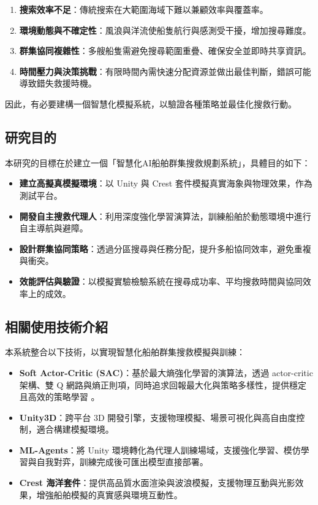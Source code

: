 \documentclass[12pt,a4paper]{article}
\begin{document}
\begin{enumerate}
\item \textbf{搜索效率不足}：傳統搜索在大範圍海域下難以兼顧效率與覆蓋率。
\item \textbf{環境動態與不確定性}：風浪與洋流使船隻航行與感測受干擾，增加搜尋難度\cite{IAMSAR2008}。
\item \textbf{群集協同複雜性}：多艘船隻需避免搜尋範圍重疊、確保安全並即時共享資訊\cite{IAMSAR2008}。
\item \textbf{時間壓力與決策挑戰}：有限時間內需快速分配資源並做出最佳判斷，錯誤可能導致錯失救援時機。
\end{enumerate}

因此，有必要建構一個智慧化模擬系統，以驗證各種策略並最佳化搜救行動。

\subsection{研究目的}
本研究的目標在於建立一個「智慧化AI船舶群集搜救規劃系統」，具體目的如下：

\begin{itemize}
\item \textbf{建立高擬真模擬環境}：以 Unity 與 Crest 套件模擬真實海象與物理效果，作為測試平台。
\item \textbf{開發自主搜救代理人}：利用深度強化學習演算法，訓練船舶於動態環境中進行自主導航與避障。
\item \textbf{設計群集協同策略}：透過分區搜尋與任務分配，提升多船協同效率，避免重複與衝突。
\item \textbf{效能評估與驗證}：以模擬實驗檢驗系統在搜尋成功率、平均搜救時間與協同效率上的成效。
\end{itemize}

\subsection{相關使用技術介紹}

本系統整合以下技術，以實現智慧化船舶群集搜救模擬與訓練：

\begin{itemize}
	\item \textbf{Soft Actor-Critic (SAC)}：基於最大熵強化學習的演算法，透過 actor-critic 架構、雙 Q 網路與熵正則項，同時追求回報最大化與策略多樣性，提供穩定且高效的策略學習 \cite{Atari}\cite{SAC}。
	\item \textbf{Unity3D}：跨平台 3D 開發引擎，支援物理模擬、場景可視化與高自由度控制，適合構建模擬環境。
	\item \textbf{ML-Agents}：將 Unity 環境轉化為代理人訓練場域，支援強化學習、模仿學習與自我對弈，訓練完成後可匯出模型直接部署\cite{MLAgentRepo}。
	 \item \textbf{Crest 海洋套件}：提供高品質水面渲染與波浪模擬，支援物理互動與光影效果，增強船舶模擬的真實感與環境互動性\cite{CrestIntro}。
\end{itemize}
\end{document}
